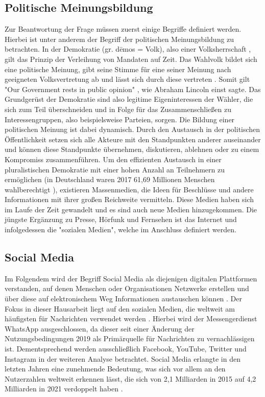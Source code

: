 \subsection{Politische Meinungsbildung}
Zur Beantwortung der Frage müssen zuerst einige Begriffe definiert werden. Hierbei ist unter anderem der Begriff der politischen Meinungsbildung zu betrachten.
In der Demokratie (gr. dēmos = Volk), also einer Volksherrschaft \autocite[vgl.][]{BegriffDemokratieBPB}, gilt das Prinzip der Verleihung von Mandaten auf Zeit. Das Wahlvolk bildet sich eine politische Meinung, gibt seine Stimme für eine seiner Meinung nach geeigneten Volksvertretung ab und lässt sich durch diese vertreten \autocite[vgl.][]{VolksvertretungBPB}. Somit gilt  "Our Government rests in public opinion" \autocite[]{SpeechALincoln}, wie Abraham Lincoln einst sagte. Das Grundgerüst der Demokratie sind also legitime Eigeninteressen der Wähler, die sich zum Teil überschneiden und in Folge für das Zusammenschließen zu Interessengruppen, also beispielsweise Parteien, sorgen. Die Bildung einer politischen Meinung ist dabei dynamisch. Durch den Austausch in der politischen Öffentlichkeit setzen sich alle Akteure mit den Standpunkten anderer auseinander und können diese Standpunkte übernehmen, diskutieren, ablehnen oder zu einem Kompromiss zusammenführen. Um den effizienten Austausch in einer pluralistischen Demokratie mit einer hohen Anzahl an Teilnehmern zu ermöglichen (in Deutschland waren 2017 61,69 Millionen Menschen wahlberechtigt \autocite[vgl.][]{WahlberechtigteBPB}), existieren Massenmedien, die Ideen für Beschlüsse und andere Informationen mit ihrer großen Reichweite vermitteln.
Diese Medien haben sich im Laufe der Zeit gewandelt und es sind auch neue Medien hinzugekommen. Die jüngste Ergänzung zu Presse, Hörfunk und Fernsehen \autocite[vgl.][]{MassenmedienBPB} ist das Internet und infolgedessen die "sozialen Medien", welche im Anschluss definiert werden.

\subsection{Social Media}
Im Folgendem wird der Begriff \glqq Social Media\grqq{} als diejenigen digitalen Plattformen verstanden, auf denen Menschen oder Organisationen Netzwerke erstellen und über diese auf elektronischem Weg Informationen austauschen können \autocite[vgl.][S. 1]{DefSM}\autocite[S. 62-64]{kaplan2010}.
Der Fokus in dieser Hausarbeit liegt auf den sozialen Medien, die weltweit am häufigsten für Nachrichten verwendet werden \autocite[vgl.][S.~30]{DNR2020}. Hierbei wird der Messengerdienst WhatsApp ausgeschlossen, da dieser seit einer Änderung der Nutzungsbedingungen 2019 \autocite[vgl.][]{WANutz} als Primärquelle für Nachrichten zu vernachlässigen ist. Dementsprechend werden ausschließlich Facebook, YouTube, Twitter und Instagram in der weiteren Analyse betrachtet. 
Social Media erlangte in den letzten Jahren eine zunehmende Bedeutung, was sich vor allem an den Nutzerzahlen weltweit erkennen lässt, die sich von 2,1 Milliarden in 2015 auf 4,2 Milliarden in 2021 verdoppelt haben \autocite[vgl.][]{UsersWorldwideSM}. 

